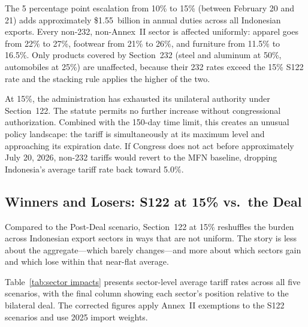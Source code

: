 \documentclass[12pt,a4paper]{article}
\begin{document}
The 5 percentage point escalation from 10\% to 15\% (between February 20 and 21) adds approximately \$1.55~billion in annual duties across all Indonesian exports. Every non-232, non-Annex~II sector is affected uniformly: apparel goes from 22\% to 27\%, footwear from 21\% to 26\%, and furniture from 11.5\% to 16.5\%. Only products covered by Section~232 (steel and aluminum at 50\%, automobiles at 25\%) are unaffected, because their 232 rates exceed the 15\% S122 rate and the stacking rule applies the higher of the two.

At 15\%, the administration has exhausted its unilateral authority under Section~122. The statute permits no further increase without congressional authorization. Combined with the 150-day time limit, this creates an unusual policy landscape: the tariff is simultaneously at its maximum level and approaching its expiration date. If Congress does not act before approximately July 20, 2026, non-232 tariffs would revert to the MFN baseline, dropping Indonesia's average tariff rate back toward 5.0\%.

\subsection{Winners and Losers: S122 at 15\% vs.\ the Deal}

Compared to the Post-Deal scenario, Section~122 at 15\% reshuffles the burden across Indonesian export sectors in ways that are not uniform. The story is less about the aggregate---which barely changes---and more about which sectors gain and which lose within that near-flat average.

Table~\ref{tab:sector impacts} presents sector-level average tariff rates across all five scenarios, with the final column showing each sector's position relative to the bilateral deal. The corrected figures apply Annex~II exemptions to the S122 scenarios and use 2025 import weights.
\end{document}
